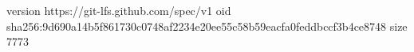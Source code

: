 version https://git-lfs.github.com/spec/v1
oid sha256:9d690a14b5f861730c0748af2234e20ee55c58b59eacfa0feddbccf3b4ce8748
size 7773
